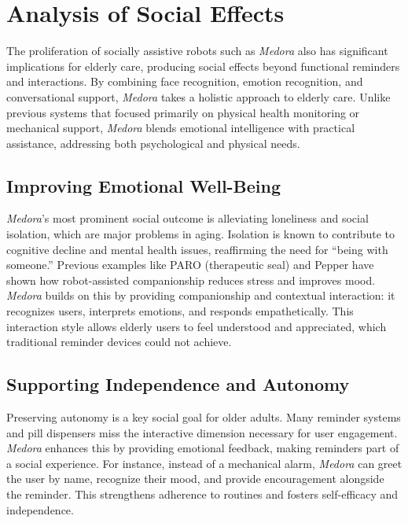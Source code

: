 \section{ Analysis of Social Effects}

The proliferation of socially assistive robots such as \textit{Medora} also has significant implications for elderly care, producing social effects beyond functional reminders and interactions. By combining face recognition, emotion recognition, and conversational support, \textit{Medora} takes a holistic approach to elderly care. Unlike previous systems that focused primarily on physical health monitoring or mechanical support, \textit{Medora} blends emotional intelligence with practical assistance, addressing both psychological and physical needs.

\subsection*{Improving Emotional Well-Being}

\textit{Medora}'s most prominent social outcome is alleviating loneliness and social isolation, which are major problems in aging. Isolation is known to contribute to cognitive decline and mental health issues, reaffirming the need for ``being with someone.'' Previous examples like PARO (therapeutic seal) and Pepper have shown how robot-assisted companionship reduces stress and improves mood. \textit{Medora} builds on this by providing companionship and contextual interaction: it recognizes users, interprets emotions, and responds empathetically. This interaction style allows elderly users to feel understood and appreciated, which traditional reminder devices could not achieve.

\subsection{Supporting Independence and Autonomy}

Preserving autonomy is a key social goal for older adults. Many reminder systems and pill dispensers miss the interactive dimension necessary for user engagement. \textit{Medora} enhances this by providing emotional feedback, making reminders part of a social experience. For instance, instead of a mechanical alarm, \textit{Medora} can greet the user by name, recognize their mood, and provide encouragement alongside the reminder. This strengthens adherence to routines and fosters self-efficacy and independence.

